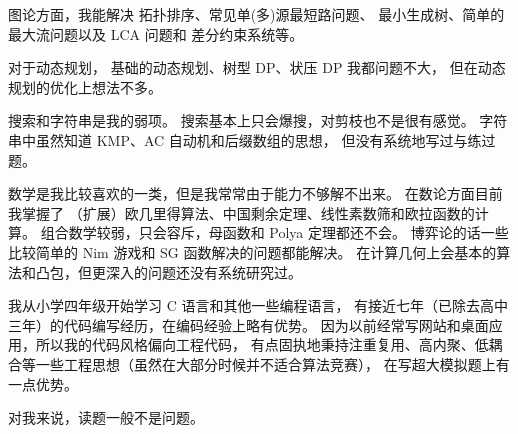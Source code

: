 \documentclass[UTF8]{ctexart}
\begin{document}
图论方面，我能解决
拓扑排序、常见单(多)源最短路问题、
最小生成树、简单的最大流问题以及 LCA 问题和
差分约束系统等。

对于动态规划，
基础的动态规划、树型 DP、状压 DP 我都问题不大，
但在动态规划的优化上想法不多。

搜索和字符串是我的弱项。
搜索基本上只会爆搜，对剪枝也不是很有感觉。
字符串中虽然知道 KMP、AC 自动机和后缀数组的思想，
但没有系统地写过与练过题。

数学是我比较喜欢的一类，但是我常常由于能力不够解不出来。
在数论方面目前我掌握了
（扩展）欧几里得算法、中国剩余定理、线性素数筛和欧拉函数的计算。
组合数学较弱，只会容斥，母函数和 Polya 定理都还不会。
博弈论的话一些比较简单的 Nim 游戏和 SG 函数解决的问题都能解决。
在计算几何上会基本的算法和凸包，但更深入的问题还没有系统研究过。

我从小学四年级开始学习 C 语言和其他一些编程语言，
有接近七年（已除去高中三年）的代码编写经历，在编码经验上略有优势。
因为以前经常写网站和桌面应用，所以我的代码风格偏向工程代码，
有点固执地秉持注重复用、高内聚、低耦合等一些工程思想（虽然在大部分时候并不适合算法竞赛），
在写超大模拟题上有一点优势。

对我来说，读题一般不是问题。
\end{document}
